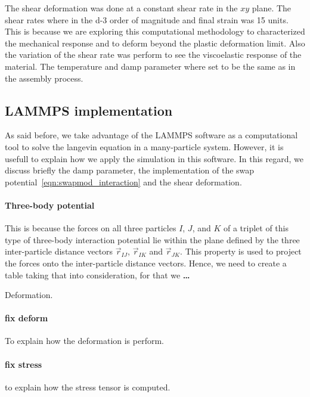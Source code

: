 The shear deformation was done at a constant shear rate in the $xy$ plane.
The shear rates where in the \num{d-3} order of magnitude and final strain was \num{15} units.
This is because we are exploring this computational methodology to characterized the mechanical response and to deform beyond the plastic deformation limit.
Also the variation of the shear rate was perform to see the viscoelastic response of the material.
The temperature and damp parameter where set to be the same as in the assembly process.

\subsection{LAMMPS implementation}

As said before, we take advantage of the LAMMPS software as a computational tool to solve the langevin equation in a many-particle system.
However, it is usefull to explain how we apply the simulation in this software.
In this regard, we discuss briefly the $\mathrm{damp}$ parameter, the implementation of the swap potential~\eqref{eqn:swapmod_interaction} and the shear deformation.

\paragraph{Three-body potential}
This is because the forces on all three particles $I$, $J$, and $K$ of a triplet of this type of three-body interaction potential lie within the plane defined by the three inter-particle distance vectors $\vec{r}_{IJ}$, $\vec{r}_{IK}$ and $\vec{r}_{JK}$.
This property is used to project the forces onto the inter-particle distance vectors.
Hence, we need to create a table taking that into consideration, for that we \textbf{\ldots}

Deformation.

\paragraph{fix deform} To explain how the deformation is perform.

\paragraph{fix stress} to explain how the stress tensor is computed.

